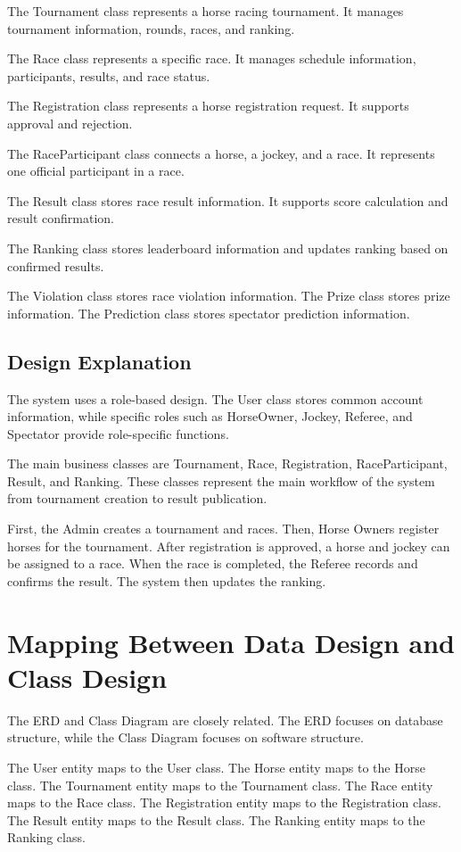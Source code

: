 The Tournament class represents a horse racing tournament. It manages tournament information, rounds, races, and ranking.

The Race class represents a specific race. It manages schedule information, participants, results, and race status.

The Registration class represents a horse registration request. It supports approval and rejection.

The RaceParticipant class connects a horse, a jockey, and a race. It represents one official participant in a race.

The Result class stores race result information. It supports score calculation and result confirmation.

The Ranking class stores leaderboard information and updates ranking based on confirmed results.

The Violation class stores race violation information. The Prize class stores prize information. The Prediction class stores spectator prediction information.

\subsection{Design Explanation}

The system uses a role-based design. The User class stores common account information, while specific roles such as HorseOwner, Jockey, Referee, and Spectator provide role-specific functions.

The main business classes are Tournament, Race, Registration, RaceParticipant, Result, and Ranking. These classes represent the main workflow of the system from tournament creation to result publication.

First, the Admin creates a tournament and races. Then, Horse Owners register horses for the tournament. After registration is approved, a horse and jockey can be assigned to a race. When the race is completed, the Referee records and confirms the result. The system then updates the ranking.

\section{Mapping Between Data Design and Class Design}

The ERD and Class Diagram are closely related. The ERD focuses on database structure, while the Class Diagram focuses on software structure.

The User entity maps to the User class. The Horse entity maps to the Horse class. The Tournament entity maps to the Tournament class. The Race entity maps to the Race class. The Registration entity maps to the Registration class. The Result entity maps to the Result class. The Ranking entity maps to the Ranking class.

